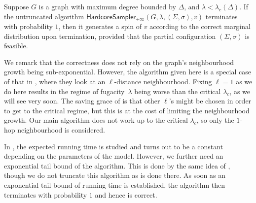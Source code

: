 \documentclass{theoretics}
\renewcommand{\Pr}{\mathop{\mathrm{Pr}}\nolimits}
\newcommand{\hcsampler}{\mathsf{HardcoreSampler}}
\newcommand{\dTV}{d_{\mathrm{TV}}}
\begin{document}
\begin{theorem}[{\cite[Theorem 5.3]{AJ22}}]
Suppose $G$ is a graph with maximum degree bounded by $\Delta$, and $\lambda<\lambda_c(\Delta)$. 
If the untruncated algorithm $\hcsampler{}_{+\infty}(G,\lambda,(\Sigma,\sigma),v)$ terminates with probability $1$, then it generates a spin of $v$ according to the correct marginal distribution upon termination, provided that the partial configuration $(\Sigma,\sigma)$ is feasible. 
\end{theorem}

We remark that the correctness does not rely on the graph's neighbourhood growth being sub-exponential. 
However, the algorithm given here is a special case of that in \cite{AJ22}, where they look at an $\ell$-distance neighbourhood. 
Fixing $\ell=1$ as we do here results in the regime of fugacity~$\lambda$ being worse than the critical $\lambda_c$, as we will see very soon. 
The saving grace of \cite{AJ22} is that other $\ell$'s might be chosen in order to get to the critical regime, but this is at the cost of limiting the neighbourhood growth. 
Our main algorithm does not work up to the critical $\lambda_c$, so only the $1$-hop neighbourhood is considered. 



In \cite{AJ22}, the expected running time is studied and turns out to be a constant depending on the parameters of the model. 
However, we further need an exponential tail bound of the algorithm. 
This is done by the same idea of \cite[Section B.3]{FGWWY22}, 
though we do not truncate this algorithm as is done there. 
As soon as an exponential tail bound of running time is established, the algorithm then terminates with probability $1$ and hence is correct. 
\end{document}
